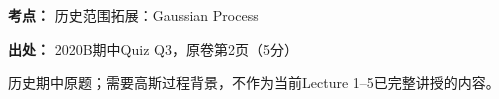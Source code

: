 \textbf{考点：} 历史范围拓展：Gaussian Process


\textbf{出处：} 2020B期中Quiz Q3，原卷第2页（5分）


历史期中原题；需要高斯过程背景，不作为当前Lecture 1–5已完整讲授的内容。
